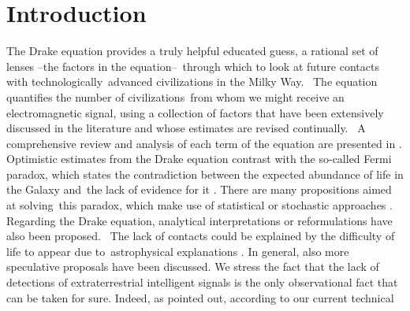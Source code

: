 \documentclass[crop]{CSLB}
\begin{document}
\maketitle


\section{Introduction}\label{S_motivations}

The Drake equation  \citep{drake_intelligent_1962} provides a truly
helpful educated guess, a rational set of lenses --the factors in the
equation-- through which to look at future contacts with
technologically advanced civilizations in the Milky Way. 
%
The equation quantifies the number of civilizations from whom we might
receive an electromagnetic signal, using a collection of factors that
have been extensively discussed in the literature and whose estimates
are revised continually. 
%
A comprehensive review and analysis of each term of the equation are
presented in \citet{vakoch_drake_2015}.
%
Optimistic estimates from the Drake equation contrast with the
so-called Fermi paradox, which states the contradiction between the
expected abundance of life in the Galaxy and the lack of evidence for
it \citep[e.g. ][]{hart_explanation_1975, brin_great_1983,
barlow_galactic_2012, forgan_galactic_2016, vanhouten_isthere_2017,
Sotos_biotechnology_2019, carroll_nellemback_fermi_2019}.
%
There are many propositions aimed at solving this paradox, which make
use of statistical \citep{solomonides_probabilistic_2016,
vanhouten_isthere_2017, horvat_calculating_2007,
maccone_statistical_2015} or stochastic approaches
\citep{forgan_numerical_2009, bloetscher_using_2019,
glade_stochastic_2011, forgan_numerical_2010}.
%
Regarding the Drake equation, analytical interpretations
\citep{prantzos_joint_2013, smith_broadcasting_2009} or reformulations
\citep[][and references therein]{burchell_whither_2006} have also been
proposed. 
%
The lack of contacts could be explained by the difficulty of life to
appear due to astrophysical explanations
\citep{annis_astrophysical_1999}.
%
In general, also more speculative proposals
\citep{barlow_galactic_2013, lampton_information_2013,
conway_three_2018, forgan_galactic_2017} have been discussed.
% 
We stress the fact that the lack of detections of extraterrestrial
intelligent signals is the only observational fact that can be taken
for sure.
%
Indeed, as \citep{tarter_search_2001} pointed out, according to our current technical
\end{document}
